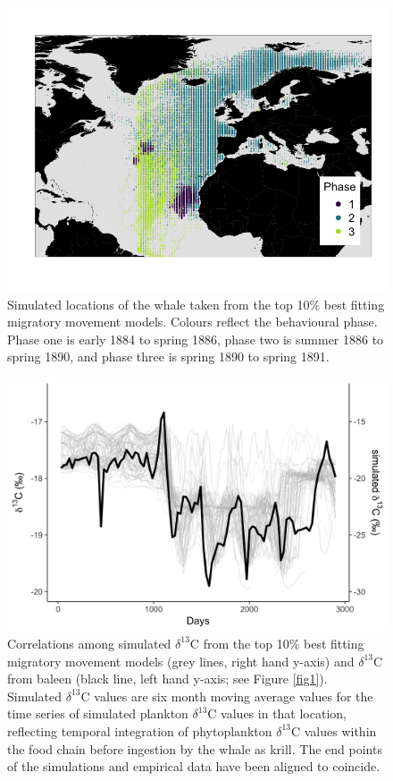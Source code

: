 \documentclass[a4paper,12pt]{article}
\begin{document}
\begin{figure}
 \centering
 \includegraphics[width = \linewidth]{figures/Figure-2-points.png}
  \caption{Simulated locations of the whale taken from the top 10\% best fitting migratory movement models. 
  Colours reflect the behavioural phase. 
  Phase one is early 1884 to spring 1886, phase two is summer 1886 to spring 1890, and phase three is spring 1890 to spring 1891.}
  \label{fig2}
\end{figure}

\begin{figure}
 \centering
  \includegraphics[width = \linewidth]{figures/Figure-3-blue-sims.png}
  \caption{Correlations among simulated $\delta^{13}$C from the top 10\% best fitting migratory movement models (grey lines, right hand y-axis) and $\delta^{13}$C from baleen (black line, left hand y-axis; see Figure \ref{fig1}). 
  Simulated $\delta^{13}$C values are six month moving average values for the time series of simulated plankton $\delta^{13}$C values in that location, reflecting temporal integration of phytoplankton $\delta^{13}$C values within the food chain before ingestion by the whale as krill. 
  The end points of the simulations and empirical data have been aligned to coincide.
}
  \label{fig3}
\end{figure}
 
\end{document}

